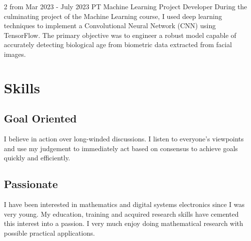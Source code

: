 \documentclass[10pt]{curriculum}
\begin{document}
\begin{paracol}{2}
\jobentry
	{from Mar 2023 - July 2023} %
	{PT} %
	{}
	{Machine Learning Project Developer}
	{During the culminating project of the Machine Learning course, I used deep learning techniques to implement a Convolutional Neural Network (CNN) using TensorFlow. The primary objective was to engineer a robust model capable of accurately detecting biological age from biometric data extracted from facial images.}


\section{Skills}

\subsection{Goal Oriented}

I believe in action over long-winded discussions. I listen to everyone's viewpoints and use my judgement to immediately act based on consensus to achieve goals quickly and efficiently.

\subsection{Passionate}
I have been interested in mathematics and digital systems electronics since I was very young. My education, training and acquired research skills have cemented this interest into a passion. I very much enjoy doing mathematical research with possible practical applications.




\switchcolumn %



\end{paracol}
\end{document}
